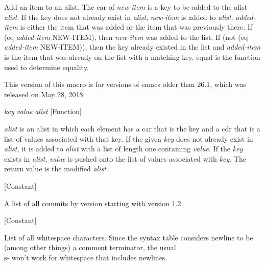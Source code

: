 \begin{doc-string}
Add an item to an alist.  The car of \emph{new-item} is a key to be added to
the alist \emph{alist}.  If the key does not already exist in \emph{alist}, \emph{new-item} is added
to \emph{alist}.  \emph{added-item} is either the item that was added or the item that was
previously there.  If (eq \emph{added-item} NEW-ITEM), then \emph{new-item} was added to the
list.  If (not (eq \emph{added-item} NEW-ITEM)), then the key already existed in the
list and \emph{added-item} is the item that was already on the list with a matching
key.  equal is the function used to determine equality.

This version of this macro is for versions of emacs older than 26.1, which was
released on May 28, 2018
\end{doc-string}

\vspace{1em}
\noindent
{}
\usebox{\funcname}\emph{key} \emph{value} \emph{alist}
 \hfill [Function]

\begin{doc-string}
\emph{alist} is an alist in which each element has a car that is the key and a cdr
that is a list of values associated with that key.  If the given \emph{key} does not
already exist in \emph{alist}, it is added to \emph{alist} with a list of length one
containing \emph{value}.  If the \emph{key} exists in \emph{alist}, \emph{value} is pushed onto the list of
values associated with \emph{key}.  The return value is the modified \emph{alist}.
\end{doc-string}

\vspace{1em}
\noindent
{}
\usebox{\funcname}
 \hfill [Constant]

\begin{doc-string}
A list of all commits by version starting with version 1.2
\end{doc-string}

\vspace{1em}
\noindent
{}
\usebox{\funcname}
 \hfill [Constant]

\begin{doc-string}
List of all whitespace characters.
Since the syntax table considers newline to be (among other things) a
comment terminator, the usual \\s- won't work for whitespace that includes
newlines.
\end{doc-string}

